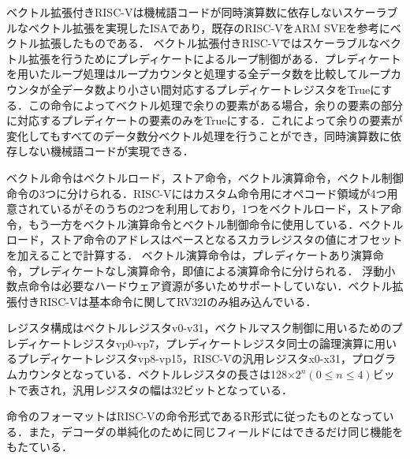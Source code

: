 
ベクトル拡張付きRISC-Vは機械語コードが同時演算数に依存しないスケーラブルなベクトル拡張を実現したISAであり，既存のRISC-VをARM SVEを参考にベクトル拡張したものである．
ベクトル拡張付きRISC-Vではスケーラブルなベクトル拡張を行うためにプレディケートによるループ制御がある．プレディケートを用いたループ処理はループカウンタと処理する全データ数を比較してループカウンタが全データ数より小さい間対応するプレディケートレジスタをTrueにする．この命令によってベクトル処理で余りの要素がある場合，余りの要素の部分に対応するプレディケートの要素のみをTrueにする．これによって余りの要素が変化してもすべてのデータ数分ベクトル処理を行うことができ，同時演算数に依存しない機械語コードが実現できる．

ベクトル命令はベクトルロード，ストア命令，ベクトル演算命令，ベクトル制御命令の3つに分けられる．RISC-Vにはカスタム命令用にオペコード領域が4つ用意されているがそのうちの2つを利用しており，1つをベクトルロード，ストア命令，もう一方をベクトル演算命令とベクトル制御命令に使用している．ベクトルロード，ストア命令のアドレスはベースとなるスカラレジスタの値にオフセットを加えることで計算する．
ベクトル演算命令は，プレディケートあり演算命令，プレディケートなし演算命令，即値による演算命令に分けられる．
浮動小数点命令は必要なハードウェア資源が多いためサポートしていない．ベクトル拡張付きRISC-Vは基本命令に関してRV32Iのみ組み込んでいる．

レジスタ構成はベクトルレジスタv0-v31，ベクトルマスク制御に用いるためのプレディケートレジスタvp0-vp7，プレディケートレジスタ同士の論理演算に用いるプレディケートレジスタvp8-vp15，RISC-Vの汎用レジスタx0-x31，プログラムカウンタとなっている．ベクトルレジスタの長さは128$\times 2^n(0\leq n\leq 4)$ビットで表され，汎用レジスタの幅は32ビットとなっている．

命令のフォーマットはRISC-Vの命令形式であるR形式に従ったものとなっている．また，デコーダの単純化のために同じフィールドにはできるだけ同じ機能をもたている．

